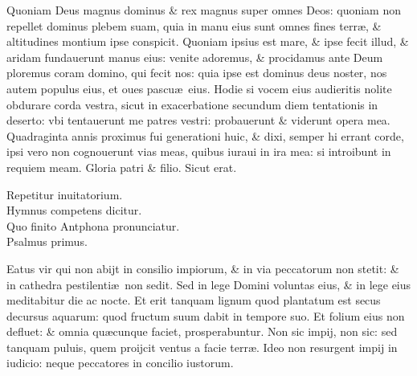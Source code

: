 \documentclass[a5paper,10pt]{book}
\def\rightmarginnote{%
	\xymarginnote{\hskip\columnwidth \hskip -1em}}
\def\ae{æ}
\begin{document}
\begin{multicols*}{2}
\newline
\color{red} Q\color{black}uoniam Deus magnus dominus \& rex magnus super omnes %
Deos: quoniam non repellet dominus plebem suam, quia in manu eius sunt omnes fines terr\ae , \& altitudines montium ipse conspicit.
\newline
\color{red} Q\color{black}uoniam ipsius est mare, \& ipse fecit illud, \& aridam fundauerunt manus eius: venite adoremus, \& procidamus ante Deum ploremus coram domino, qui fecit nos: quia ipse est dominus deus noster, nos autem populus eius, et oues pascu\ae \ eius.
\newline
\rightmarginnote{If\\today}
\color{red} H\color{black}odie si vocem eius audieritis nolite obdurare corda vestra, sicut in exacerbatione secundum diem tentationis in deserto: vbi tentauerunt me patres vestri: probauerunt \& viderunt opera mea.
\newline
\color{red} Q\color{black}uadraginta annis proximus fui generationi huic, \& dixi, semper hi errant corde, ipsi vero non cognouerunt vias meas, quibus iuraui in ira mea: si introibunt in requiem meam.
\newline
\color{red} G\color{black}loria patri \& filio. Sicut erat.
\vspace{-1em}
\begin{center} \color{red}
Repetitur inuitatorium.\\
Hymnus competens dicitur.\\
Quo finito Antphona pronunciatur.\\
\hypertarget{ps1}{Psalmus primus.}
\end{center}
\vspace{-1em}
Eatus vir qui non abijt in consilio impiorum, \& in via peccatorum non stetit: \& in cathedra pestilenti\ae \ non sedit.
\newline \color{red} S\color{black}ed in lege Domini voluntas eius, \& in lege eius meditabitur die ac nocte.
\newline \color{red} E\color{black}t erit tanquam lignum quod plantatum est secus decursus aquarum: quod fructum suum dabit in tempore suo.
\newline \color{red} E\color{black}t folium eius non defluet: \& omnia qu\ae cunque %
faciet, prosperabuntur.
\newline \color{red} N\color{black}on sic impij, non sic: sed tanquam puluis, quem proijcit ventus a facie terr\ae .
\newline \color{red} I\color{black}deo non resurgent impij in iudicio: neque peccatores in concilio iustorum.

\end{multicols*}
\end{document}

